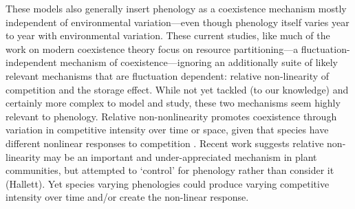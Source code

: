 \documentclass[11pt]{article}
\begin{document}
These models also generally insert phenology as a coexistence mechanism mostly independent of environmental variation---even though phenology itself varies year to year with environmental variation. These current studies, like much of the work on modern coexistence theory focus on resource partitioning---a fluctuation-independent mechanism of coexistence---ignoring an additionally suite of likely relevant mechanisms that are fluctuation dependent: relative non-linearity of competition and the storage effect. While not yet tackled (to our knowledge) and certainly more complex to model and study, these two mechanisms seem highly relevant to phenology. Relative non-nonlinearity promotes coexistence through variation in competitive intensity over time or space, given that species have different nonlinear responses to competition \citep{CHESSON:1994vn,Chesson:2000vd}. Recent work suggests relative non-linearity may be an important and under-appreciated mechanism in plant communities, but attempted to `control' for phenology rather than consider it (Hallett). Yet species varying phenologies could produce varying competitive intensity over time and/or create the non-linear response. 
\end{document}
